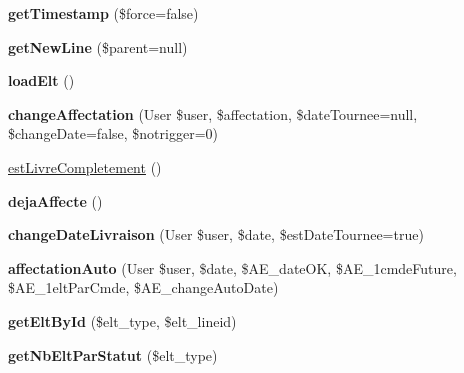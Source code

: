 \begin{DoxyCompactItemize}
\mbox{\label{classTourneeUnique__lines__cmde_acfd85b2b924997b7723e34be3e5b9d08}} 
{\bfseries get\+Timestamp} (\$force=false)
\item 
\mbox{\label{classTourneeUnique__lines__cmde_a3056ad310d4b05f5169621d2fbc65f6d}} 
{\bfseries get\+New\+Line} (\$parent=null)
\item 
\mbox{\label{classTourneeUnique__lines__cmde_ad06d54bc9931dacf3dae70a992d91e6e}} 
{\bfseries load\+Elt} ()
\item 
\mbox{\label{classTourneeUnique__lines__cmde_aad3baa358d401140b531c72ebd3af279}} 
{\bfseries change\+Affectation} (User \$user, \$affectation, \$date\+Tournee=null, \$change\+Date=false, \$notrigger=0)
\item 
\hyperlink{classTourneeUnique__lines__cmde_a8958d3b2f13ab3af8651cce57a0420ba}{est\+Livre\+Completement} ()
\item 
\mbox{\label{classTourneeUnique__lines__cmde_ad021486e3bb581d426f346611f7d342e}} 
{\bfseries deja\+Affecte} ()
\item 
\mbox{\label{classTourneeUnique__lines__cmde_ad211d947aca3c9f40ecb68d24a7e24e3}} 
{\bfseries change\+Date\+Livraison} (User \$user, \$date, \$est\+Date\+Tournee=true)
\item 
\mbox{\label{classTourneeUnique__lines__cmde_a86a7bf7b8ca7556c149393b93477f1e1}} 
{\bfseries affectation\+Auto} (User \$user, \$date, \$A\+E\+\_\+date\+OK, \$A\+E\+\_\+1cmde\+Future, \$A\+E\+\_\+1elt\+Par\+Cmde, \$A\+E\+\_\+change\+Auto\+Date)
\item 
\mbox{\label{classTourneeUnique__lines__cmde_a14b9e906eacfcdf650955a5d9ac2503c}} 
{\bfseries get\+Elt\+By\+Id} (\$elt\+\_\+type, \$elt\+\_\+lineid)
\item 
\mbox{\label{classTourneeUnique__lines__cmde_a4d210c629896f775e542c6388e9ff119}} 
{\bfseries get\+Nb\+Elt\+Par\+Statut} (\$elt\+\_\+type)

\end{DoxyCompactItemize}
